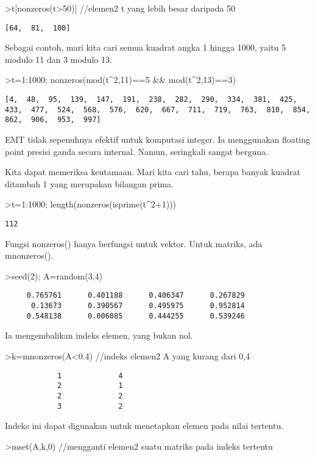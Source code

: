 \documentclass[
]{book}
\begin{document}
\textgreater t{[}nonzeros(t\textgreater50){]} //elemen2 t yang lebih besar daripada 50

\begin{verbatim}
[64,  81,  100]
\end{verbatim}

Sebagai contoh, mari kita cari semua kuadrat angka 1 hingga 1000, yaitu 5 modulo 11 dan 3 modulo 13.

\textgreater t=1:1000; nonzeros(mod(t\^{}2,11)==5 \&\& mod(t\^{}2,13)==3)

\begin{verbatim}
[4,  48,  95,  139,  147,  191,  238,  282,  290,  334,  381,  425,
433,  477,  524,  568,  576,  620,  667,  711,  719,  763,  810,  854,
862,  906,  953,  997]
\end{verbatim}

EMT tidak sepenuhnya efektif untuk komputasi integer. Ia menggunakan floating point presisi ganda secara internal. Namun, seringkali sangat berguna.

Kita dapat memeriksa keutamaan. Mari kita cari tahu, berapa banyak kuadrat ditambah 1 yang merupakan bilangan prima.

\textgreater t=1:1000; length(nonzeros(isprime(t\^{}2+1)))

\begin{verbatim}
112
\end{verbatim}

Fungsi nonzeros() hanya berfungsi untuk vektor. Untuk matriks, ada mnonzeros().

\textgreater seed(2); A=random(3,4)

\begin{verbatim}
     0.765761      0.401188      0.406347      0.267829 
      0.13673      0.390567      0.495975      0.952814 
     0.548138      0.006085      0.444255      0.539246 
\end{verbatim}

Ia mengembalikan indeks elemen, yang bukan nol.

\textgreater k=mnonzeros(A\textless0.4) //indeks elemen2 A yang kurang dari 0,4

\begin{verbatim}
            1             4 
            2             1 
            2             2 
            3             2 
\end{verbatim}

Indeks ini dapat digunakan untuk menetapkan elemen pada nilai tertentu.

\textgreater mset(A,k,0) //mengganti elemen2 suatu matriks pada indeks tertentu
\end{document}

